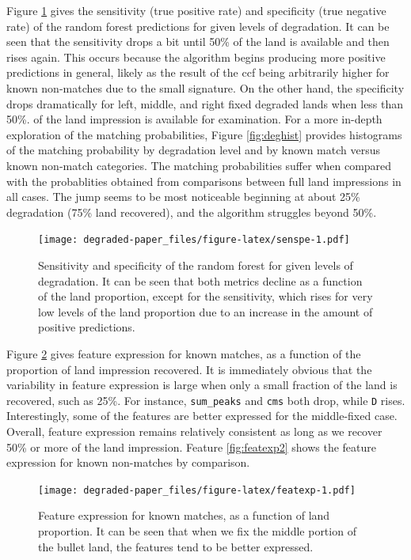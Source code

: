 \documentclass[12pt,]{article}
\theoremstyle{definition}
\theoremstyle{definition}
\theoremstyle{definition}
\theoremstyle{remark}
\begin{document}
Figure \ref{fig:senspe} gives the sensitivity (true positive rate) and
specificity (true negative rate) of the random forest predictions for
given levels of degradation. It can be seen that the sensitivity drops a
bit until 50\% of the land is available and then rises again. This
occurs because the algorithm begins producing more positive predictions
in general, likely as the result of the ccf being arbitrarily higher for
known non-matches due to the small signature. On the other hand, the
specificity drops dramatically for left, middle, and right fixed
degraded lands when less than 50\%. of the land impression is available
for examination. For a more in-depth exploration of the matching
probabilities, Figure \ref{fig:deghist} provides histograms of the
matching probability by degradation level and by known match versus
known non-match categories. The matching probabilities suffer when
compared with the probablities obtained from comparisons between full
land impressions in all cases. The jump seems to be most noticeable
beginning at about 25\% degradation (75\% land recovered), and the
algorithm struggles beyond 50\%.

\begin{figure}[htbp]
\centering
\texttt{[image: degraded-paper\_files/figure-latex/senspe-1.pdf]}
\caption{\label{fig:senspe}Sensitivity and specificity of the random forest
for given levels of degradation. It can be seen that both metrics
decline as a function of the land proportion, except for the
sensitivity, which rises for very low levels of the land proportion due
to an increase in the amount of positive predictions.}
\end{figure}

Figure \ref{fig:featexp} gives feature expression for known matches, as
a function of the proportion of land impression recovered. It is
immediately obvious that the variability in feature expression is large
when only a small fraction of the land is recovered, such as 25\%. For
instance, \texttt{sum\_peaks} and \texttt{cms} both drop, while
\texttt{D} rises. Interestingly, some of the features are better
expressed for the middle-fixed case. Overall, feature expression remains
relatively consistent as long as we recover 50\% or more of the land
impression. Feature \ref{fig:featexp2} shows the feature expression for
known non-matches by comparison.

\begin{figure}[htbp]
\centering
\texttt{[image: degraded-paper\_files/figure-latex/featexp-1.pdf]}
\caption{\label{fig:featexp}Feature expression for known matches, as a
function of land proportion. It can be seen that when we fix the middle
portion of the bullet land, the features tend to be better expressed.}
\end{figure}
\end{document}
